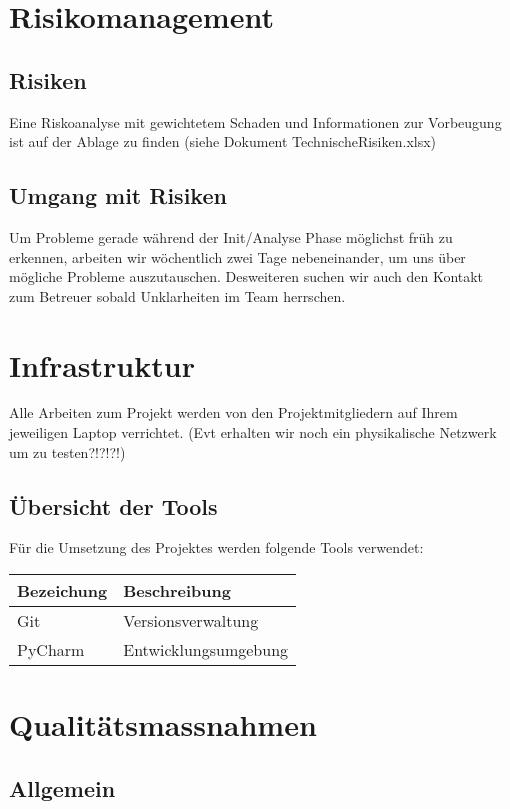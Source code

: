 \documentclass[
	ngerman,
	toc=listof, %
	toc=bibliography, %
	footnotes=multiple, %
	parskip=half, %
	numbers=noendperiod %
]{scrartcl}
\begin{document}
\section{Risikomanagement}

	\subsection{Risiken}
		Eine Riskoanalyse mit gewichtetem Schaden und Informationen zur Vorbeugung ist auf der Ablage zu
		finden (siehe Dokument TechnischeRisiken.xlsx)

	\subsection{Umgang mit Risiken}
		Um Probleme gerade während der Init/Analyse Phase möglichst früh zu erkennen, 
		arbeiten wir wöchentlich zwei Tage nebeneinander, um uns über mögliche Probleme auszutauschen. 
		Desweiteren suchen wir auch den Kontakt zum Betreuer sobald Unklarheiten im Team herrschen. 

\section{Infrastruktur}
	Alle Arbeiten zum Projekt werden von den Projektmitgliedern auf Ihrem jeweiligen Laptop verrichtet.
	(Evt erhalten wir noch ein physikalische Netzwerk um zu testen?!?!?!)

	\subsection{Übersicht der Tools}
		Für die Umsetzung des Projektes werden folgende Tools verwendet: \\[2ex]
		\begin{tabularx}{0.9\linewidth}{lX}
			\toprule
			Bezeichung & Beschreibung \\
			\midrule
			Git & Versionsverwaltung \\
			PyCharm & Entwicklungsumgebung \\
			\bottomrule
		\end{tabularx}

\section{Qualitätsmassnahmen}
	\subsection{Allgemein}
\end{document}
